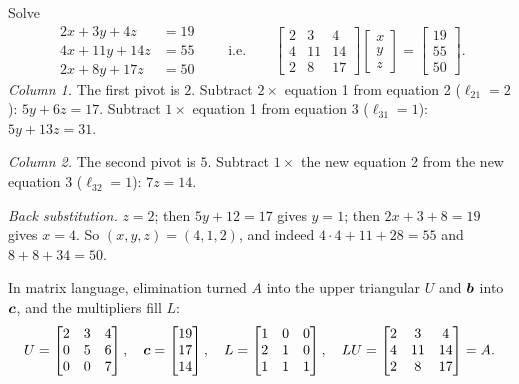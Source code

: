 \begin{example}\label{ex:u41-elim}
Solve
\[
\begin{aligned}
2x+3y+4z&=19\\
4x+11y+14z&=55\\
2x+8y+17z&=50
\end{aligned}
\qquad\text{i.e.}\qquad
\begin{bmatrix}2&3&4\\4&11&14\\2&8&17\end{bmatrix}\begin{bmatrix}x\\y\\z\end{bmatrix}=\begin{bmatrix}19\\55\\50\end{bmatrix}.
\]
\emph{Column 1.} The first pivot is $2$. Subtract $2\times$ equation 1 from equation 2 ($\ell_{21}=2$): $5y+6z=17$. Subtract $1\times$ equation 1 from equation 3 ($\ell_{31}=1$): $5y+13z=31$.

\emph{Column 2.} The second pivot is $5$. Subtract $1\times$ the new equation 2 from the new equation 3 ($\ell_{32}=1$): $7z=14$.

\emph{Back substitution.} $z=2$; then $5y+12=17$ gives $y=1$; then $2x+3+8=19$ gives $x=4$. So $(x,y,z)=(4,1,2)$, and indeed $4\cdot4+11+28=55$ and $8+8+34=50$.

In matrix language, elimination turned $A$ into the upper triangular $U$ and $\boldsymbol{b}$ into $\boldsymbol{c}$, and the multipliers fill $L$:
\[
U=\begin{bmatrix}2&3&4\\0&5&6\\0&0&7\end{bmatrix},\quad \boldsymbol{c}=\begin{bmatrix}19\\17\\14\end{bmatrix},\quad
L=\begin{bmatrix}1&0&0\\2&1&0\\1&1&1\end{bmatrix},\quad
LU=\begin{bmatrix}2&3&4\\4&11&14\\2&8&17\end{bmatrix}=A.
\]
\end{example}

